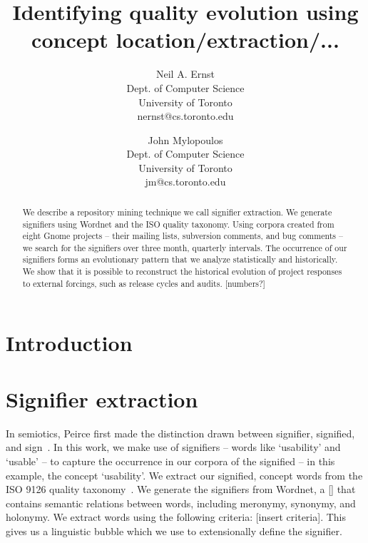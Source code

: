 \documentclass[conference, compsoc]{IEEEtran}
\begin{document}


\title{Identifying quality evolution using concept location/extraction/...}
\author{
Neil A. Ernst\\Dept. of Computer Science\\University of Toronto\\nernst@cs.toronto.edu \and
John Mylopoulos\\Dept. of Computer Science\\University of Toronto\\jm@cs.toronto.edu }

\maketitle
\thispagestyle{empty}

\begin{abstract}
We describe a repository mining technique we call signifier extraction. We generate signifiers using Wordnet and the ISO quality taxonomy. Using corpora created from eight Gnome projects -- their mailing lists, subversion comments, and bug comments -- we search for the signifiers over three month, quarterly intervals. The occurrence of our signifiers forms an evolutionary pattern that we analyze statistically and historically. We show that it is possible to reconstruct the historical evolution of project responses to external forcings, such as release cycles and audits. [numbers?]
\end{abstract}

\vspace{-2mm}
\section{Introduction}\label{sect:introduction}

\section{Signifier extraction}
In semiotics, Peirce first made the distinction drawn between signifier, signified, and sign~\cite{atkin2006}. In this work, we make use of signifiers -- words like `usability' and `usable' -- to capture the occurrence in our corpora of the signified -- in this example, the concept `usability'. We extract our signified, concept words from the ISO 9126 quality taxonomy~\cite{iso9126}. We generate the signifiers from Wordnet, a [] that contains semantic relations between words, including meronymy, synonymy, and holonymy. We extract words using the following criteria: [insert criteria]. This gives us a linguistic bubble which we use to extensionally define the signifier.
\vspace{-2mm}
\begin{footnotesize}

\end{footnotesize}
\end{document}
